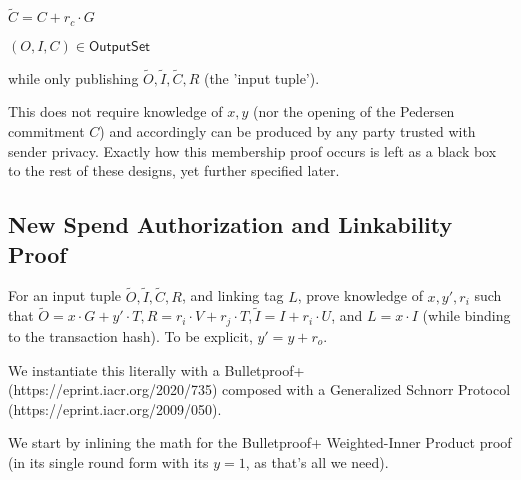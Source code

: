 \documentclass[]{article}
\begin{document}
$\tilde{C} = C + r_c \cdot G$

$(O, I, C) \in \mathsf{OutputSet}$

while only publishing $\tilde{O}, \tilde{I}, \tilde{C}, R$ (the 'input tuple').

This does not require knowledge of $x, y$ (nor the opening of the Pedersen commitment $C$) and accordingly can be produced by any party trusted with sender privacy. Exactly how this membership proof occurs is left as a black box to the rest of these designs, yet further specified later.

\newpage

\subsection{New Spend Authorization and Linkability Proof}

For an input tuple $\tilde{O}, \tilde{I}, \tilde{C}, R$, and linking tag $L$, prove knowledge of $x, y', r_i$ such that $\tilde{O} = x \cdot G + y' \cdot T, R = r_i \cdot V + r_j \cdot T, \tilde{I} = I + r_i \cdot U$, and $L = x \cdot I$ (while binding to the transaction hash). To be explicit, $y' = y + r_o$.

We instantiate this literally with a Bulletproof+ (https://eprint.iacr.org/2020/735) composed with a Generalized Schnorr Protocol (https://eprint.iacr.org/2009/050).

We start by inlining the math for the Bulletproof+ Weighted-Inner Product proof (in its single round form with its $y = 1$, as that's all we need).
\end{document}
